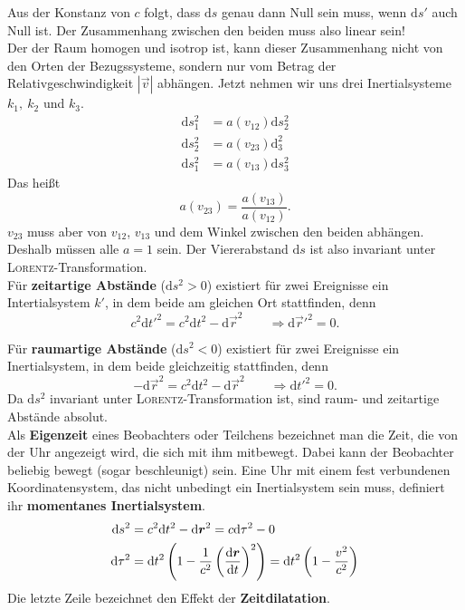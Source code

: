 Aus der Konstanz von $c$ folgt, dass $\mathrm{d}s$ genau dann Null sein muss, wenn $\mathrm{d}s'$ auch Null ist. Der Zusammenhang zwischen den beiden muss also linear sein!\\
Der der Raum homogen und isotrop ist, kann dieser Zusammenhang nicht von den Orten der Bezugssysteme, sondern nur vom Betrag der Relativgeschwindigkeit $|\vec{v}|$ abhängen. Jetzt nehmen wir uns drei Inertialsysteme $k_1,\ k_2$ und $k_3$. 
\begin{align*}
\mathrm{d}s_1^2 &= a(v_{12})\mathrm{d}s_2^2\\
\mathrm{d}s_2^2&=a(v_{23})\mathrm{d}_3^2\\
\mathrm{d}s_1^2 &=a(v_{13})\mathrm{d}s_3^2
\end{align*}
Das heißt
\begin{equation*}
a(v_{23})=\frac{a(v_{13})}{a(v_{12})}.
\end{equation*}
$v_{23}$ muss aber von $v_{12}$, $v_{13}$ und dem Winkel zwischen den beiden abhängen. Deshalb müssen alle $a=1$ sein. Der Viererabstand $\mathrm{d}s$ ist also invariant unter \textsc{Lorentz}-Transformation.\\

Für \textbf{zeitartige Abstände} ($\mathrm{d}s^2>0$) existiert für zwei Ereignisse ein Intertialsystem $k'$, in dem beide am gleichen Ort stattfinden, denn
\begin{equation*}
c^2\mathrm{d}t'^2 = c^2\mathrm{d}t^2 - \mathrm{d}\vec{r}^2 \qquad \Rightarrow \mathrm{d}\vec{r}'^2 = 0.
\end{equation*} 

Für \textbf{raumartige Abstände} ($\mathrm{d}s^2<0$) existiert für zwei Ereignisse ein Inertialsystem, in dem beide gleichzeitig stattfinden, denn
\begin{equation*}
-\mathrm{d}\vec{r}^2 =c^2\mathrm{d}t^2-\mathrm{d}\vec{r}^2 \qquad \Rightarrow \mathrm{d}t'^2 =0.
\end{equation*}
Da $\mathrm{d}s^2$ invariant unter \textsc{Lorentz}-Transformation ist, sind raum- und zeitartige Abstände absolut.\\

Als \textbf{Eigenzeit} eines Beobachters oder Teilchens bezeichnet man die Zeit, die von der Uhr angezeigt wird, die sich mit ihm mitbewegt. Dabei kann der Beobachter beliebig bewegt (sogar beschleunigt) sein. Eine Uhr mit einem fest verbundenen Koordinatensystem, das nicht unbedingt ein Inertialsystem sein muss, definiert ihr \textbf{momentanes Inertialsystem}.
\begin{align*}
\mathrm{d}s^2 &= c^2\mathrm{d}t^2 - \mathrm{d}\bm{r}^2 = c\mathrm{d}\tau^2-0\\
\mathrm{d}\tau^2 &= \mathrm{d}t^2\left(1-\frac{1}{c^2}\left(\frac{\mathrm{d}{\bm{r}}}{\mathrm{d}{t}}\right)^2\right)=\mathrm{d}t^2\left(1-\frac{v^2}{c^2}\right)\\
\end{align*}
Die letzte Zeile bezeichnet den Effekt der \textbf{Zeitdilatation}.\\ \linebreak

